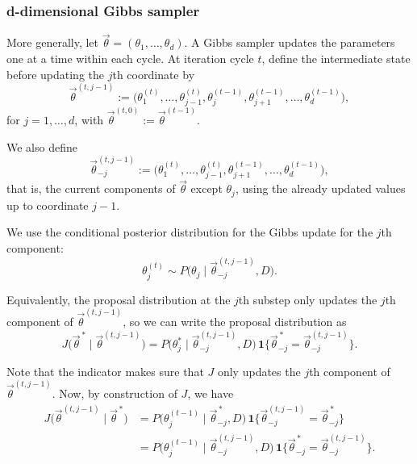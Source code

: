 \documentclass[11pt, titlepage]{article} %
\numberwithin{equation}{section}
\theoremstyle{definition}
\numberwithin{assumption}{section}
\begin{document}
\subsubsection*{d-dimensional Gibbs sampler}

More generally, let $\vec{\theta}=(\theta_1,\dots,\theta_d)$. A Gibbs sampler updates the parameters one at a time within each cycle. At iteration cycle $t$, define the intermediate state before updating the $j$th coordinate by
\begin{equation*}
\vec{\theta}^{(t,j-1)}
:=
\bigl(
\theta_1^{(t)},\dots,\theta_{j-1}^{(t)},\theta_j^{(t-1)},\theta_{j+1}^{(t-1)},\dots,\theta_d^{(t-1)}
\bigr),
\end{equation*}
for $j=1,\dots,d$, with $\vec{\theta}^{(t,0)}:=\vec{\theta}^{(t-1)}$.

We also define
\begin{equation*}
\vec{\theta}_{-j}^{(t,j-1)}
:=
\bigl(
\theta_1^{(t)},\dots,\theta_{j-1}^{(t)},\theta_{j+1}^{(t-1)},\dots,\theta_d^{(t-1)}
\bigr),
\end{equation*}
that is, the current components of $\vec{\theta}$ except $\theta_j$, using the already updated values up to coordinate $j-1$.

We use the conditional posterior distribution for the Gibbs update for the $j$th component:
\begin{equation*}
\theta_j^{(t)} \sim P\bigl(\theta_j \mid \vec{\theta}_{-j}^{(t,j-1)}, D\bigr).
\end{equation*}

Equivalently, the proposal distribution at the $j$th substep only updates the $j$th component of $\vec{\theta}^{(t,j-1)}$, so we can write the proposal distribution as
\begin{equation*}
J\bigl(\vec{\theta}^{\,*} \mid \vec{\theta}^{(t,j-1)}\bigr)
=
P\bigl(\theta_j^* \mid \vec{\theta}_{-j}^{(t,j-1)}, D\bigr)
\,\mathbf{1}\bigl\{\vec{\theta}_{-j}^{\,*}=\vec{\theta}_{-j}^{(t,j-1)}\bigr\}.
\end{equation*}

Note that the indicator makes sure that $J$ only updates the $j$th component of $\vec{\theta}^{(t,j-1)}$. Now, by construction of $J$, we have
\begin{align*}
J\bigl(\vec{\theta}^{(t,j-1)} \mid \vec{\theta}^{\,*}\bigr)
&=
P\bigl(\theta_j^{(t-1)} \mid \vec{\theta}_{-j}^{\,*}, D\bigr)
\,\mathbf{1}\bigl\{\vec{\theta}_{-j}^{(t,j-1)}=\vec{\theta}_{-j}^{\,*}\bigr\} \\
&=
P\bigl(\theta_j^{(t-1)} \mid \vec{\theta}_{-j}^{(t,j-1)}, D\bigr)
\,\mathbf{1}\bigl\{\vec{\theta}_{-j}^{\,*}=\vec{\theta}_{-j}^{(t,j-1)}\bigr\}.
\end{align*}
\end{document}
